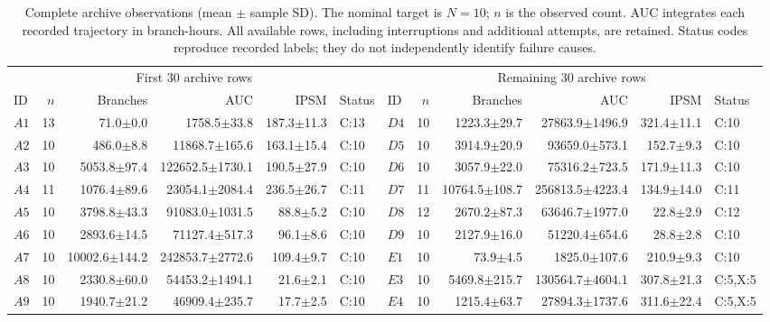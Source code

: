 \begin{table}[!b]
\centering
\caption{Complete archive observations (mean $\pm$ sample SD). The nominal target is $N=10$; $n$ is the observed count. AUC integrates each recorded trajectory in branch-hours. All available rows, including interruptions and additional attempts, are retained. Status codes reproduce recorded labels; they do not independently identify failure causes.}
\label{tab:archive_arms}
\setlength{\tabcolsep}{1.0pt}
\begin{tabular}{@{}lrrrrl@{\hspace{3pt}}lrrrrl@{}}
\toprule
\multicolumn{6}{c}{First 30 archive rows} & \multicolumn{6}{c}{Remaining 30 archive rows} \\
\cmidrule(r){1-6}\cmidrule(l){7-12}
ID & $n$ & Branches & AUC & IPSM & Status & ID & $n$ & Branches & AUC & IPSM & Status \\
\midrule
$A1$ & 13 & 71.0$\pm$0.0 & 1758.5$\pm$33.8 & 187.3$\pm$11.3 & C:13 & $D4$ & 10 & 1223.3$\pm$29.7 & 27863.9$\pm$1496.9 & 321.4$\pm$11.1 & C:10 \\
$A2$ & 10 & 486.0$\pm$8.8 & 11868.7$\pm$165.6 & 163.1$\pm$15.4 & C:10 & $D5$ & 10 & 3914.9$\pm$20.9 & 93659.0$\pm$573.1 & 152.7$\pm$9.3 & C:10 \\
$A3$ & 10 & 5053.8$\pm$97.4 & 122652.5$\pm$1730.1 & 190.5$\pm$27.9 & C:10 & $D6$ & 10 & 3057.9$\pm$22.0 & 75316.2$\pm$723.5 & 171.9$\pm$11.3 & C:10 \\
$A4$ & 11 & 1076.4$\pm$89.6 & 23054.1$\pm$2084.4 & 236.5$\pm$26.7 & C:11 & $D7$ & 11 & 10764.5$\pm$108.7 & 256813.5$\pm$4223.4 & 134.9$\pm$14.0 & C:11 \\
$A5$ & 10 & 3798.8$\pm$43.3 & 91083.0$\pm$1031.5 & 88.8$\pm$5.2 & C:10 & $D8$ & 12 & 2670.2$\pm$87.3 & 63646.7$\pm$1977.0 & 22.8$\pm$2.9 & C:12 \\
$A6$ & 10 & 2893.6$\pm$14.5 & 71127.4$\pm$517.3 & 96.1$\pm$8.6 & C:10 & $D9$ & 10 & 2127.9$\pm$16.0 & 51220.4$\pm$654.6 & 28.8$\pm$2.8 & C:10 \\
$A7$ & 10 & 10002.6$\pm$144.2 & 242853.7$\pm$2772.6 & 109.4$\pm$9.7 & C:10 & $E1$ & 10 & 73.9$\pm$4.5 & 1825.0$\pm$107.6 & 210.9$\pm$9.3 & C:10 \\
$A8$ & 10 & 2330.8$\pm$60.0 & 54453.2$\pm$1494.1 & 21.6$\pm$2.1 & C:10 & $E3$ & 10 & 5469.8$\pm$215.7 & 130564.7$\pm$4604.1 & 307.8$\pm$21.3 & C:5,X:5 \\
$A9$ & 10 & 1940.7$\pm$21.2 & 46909.4$\pm$235.7 & 17.7$\pm$2.5 & C:10 & $E4$ & 10 & 1215.4$\pm$63.7 & 27894.3$\pm$1737.6 & 311.6$\pm$22.4 & C:5,X:5 \\

\end{tabular}
\end{table}
